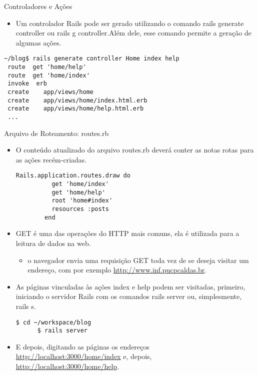 \begin{frame}{Controladores e Ações}
    \begin{itemize}
      \item Um controlador Rails pode ser gerado utilizando o comando \alert{rails 
	generate controller} ou \alert{rails g controller}.Além dele, esse comando permite 
	a geração de algumas ações.
    \end{itemize}
      \begin{lstlisting}[style=BashInputStyle]
 ~/blog$ rails generate controller Home index help
 route  get 'home/help'
 route  get 'home/index'
 invoke  erb
 create    app/views/home
 create    app/views/home/index.html.erb
 create    app/views/home/help.html.erb
 ...
      \end{lstlisting}
\end{frame}

\begin{frame}{Arquivo de Roteamento: routes.rb}
    \begin{itemize}
      \item O conteúdo atualizado do arquivo \alert{routes.rb} deverá conter as notas rotas 
	para as ações recém-criadas.
	  \begin{lstlisting}[style=RubyInputStyle, caption=config/routes.rb]
	    Rails.application.routes.draw do
	      get 'home/index'
	      get 'home/help'
	      root 'home#index'
	      resources :posts 
	    end 
	  \end{lstlisting}
    
      \item \alert{GET} é uma das operações do HTTP mais comuns, ela é utilizada para a leitura
      de dados na web.
      \begin{itemize}
	\item o navegador envia uma requisição \alert{GET} toda vez de se deseja visitar um endereço, com por exemplo \url{http://www.inf.pucpcaldas.br}. 
       
      \end{itemize}

      \item As páginas vinculadas às ações \alert{index} e \alert{help} podem ser 
	visitadas, primeiro, iniciando o servidor Rails com os comandos \alert{rails server} ou, 
	simplesmente, \alert{rails s}.
	
	\begin{lstlisting}[style=BashInputStyle]
	  $ cd ~/workspace/blog
	  $ rails server
	\end{lstlisting}
    
      \item E depois, digitando as páginas os endereços \alert{\url{http://localhost:3000/home/index}} e, depois, \alert{\url{http://localhost:3000/home/help}}.
      
    \end{itemize}
    
\end{frame}

